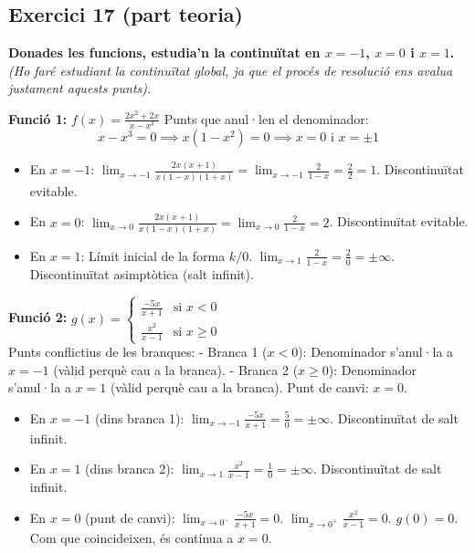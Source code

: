 \documentclass[12pt,a4paper]{article}
\begin{document}
\vspace{0.5cm}

\subsection{Exercici 17 (part teoria)}

\textbf{Donades les funcions, estudia'n la continuïtat en $x=-1$, $x=0$ i $x=1$.}
\textit{(Ho faré estudiant la continuïtat global, ja que el procés de resolució ens avalua justament aquests punts).}

\textbf{Funció 1:} $f(x) = \frac{2x^2+2x}{x-x^3}$
Punts que anul·len el denominador:
\[ x-x^3 = 0 \implies x(1-x^2) = 0 \implies x=0 \text{ i } x=\pm 1 \]

\begin{itemize}
    \item En $x=-1$: $\lim_{x \to -1} \frac{2x(x+1)}{x(1-x)(1+x)} = \lim_{x \to -1} \frac{2}{1-x} = \frac{2}{2} = 1$. Discontinuïtat evitable.
    \item En $x=0$: $\lim_{x \to 0} \frac{2x(x+1)}{x(1-x)(1+x)} = \lim_{x \to 0} \frac{2}{1-x} = 2$. Discontinuïtat evitable.
    \item En $x=1$: Límit inicial de la forma $k/0$. $\lim_{x \to 1} \frac{2}{1-x} = \frac{2}{0} = \pm\infty$. Discontinuïtat asimptòtica (salt infinit).
\end{itemize}

\textbf{Funció 2:} $g(x) = \begin{cases} \frac{-5x}{x+1} & \text{si } x < 0 \\ \frac{x^2}{x-1} & \text{si } x \ge 0 \end{cases}$ \\
Punts conflictius de les branques:
- Branca 1 ($x < 0$): Denominador s'anul·la a $x=-1$ (vàlid perquè cau a la branca).  
- Branca 2 ($x \ge 0$): Denominador s'anul·la a $x=1$ (vàlid perquè cau a la branca).  
Punt de canvi: $x=0$.

\begin{itemize}
    \item En $x=-1$ (dins branca 1): $\lim_{x \to -1} \frac{-5x}{x+1} = \frac{5}{0} = \pm \infty$. Discontinuïtat de salt infinit.
    \item En $x=1$ (dins branca 2): $\lim_{x \to 1} \frac{x^2}{x-1} = \frac{1}{0} = \pm \infty$. Discontinuïtat de salt infinit.
    \item En $x=0$ (punt de canvi): 
    $\lim_{x \to 0^-} \frac{-5x}{x+1} = 0$. 
    $\lim_{x \to 0^+} \frac{x^2}{x-1} = 0$. 
    $g(0) = 0$. Com que coincideixen, és contínua a $x=0$.
\end{itemize}
\end{document}
